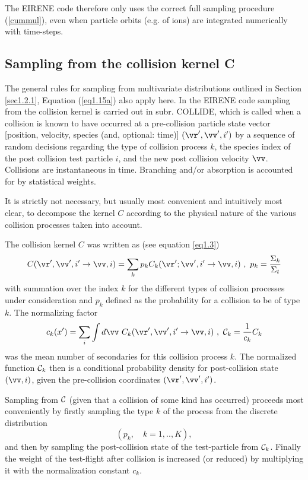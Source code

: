 The EIRENE code therefore only uses the correct full sampling procedure (\ref{cummul}), even when particle orbits (e.g. of ions) are
integrated numerically with time-steps.



\subsection{Sampling from the collision kernel C} \label{sec1.2.4}

The general rules for sampling from multivariate distributions
outlined in Section \ref{sec1.2.1}, Equation (\ref{eq1.15a}) also
apply here. In the EIRENE code sampling from the collision kernel is carried out in subr. COLLIDE, which is called when a collision is
known to have occurred at a pre-collision particle state vector [position, velocity, species (and, optional: time)] $( \vr ' , \vv ' , i ')$
by a sequence of random decisions regarding the type of collision process $k$, the species index of the post collision test particle $i$,
and the new post collision velocity $\vv$.  Collisions are instantaneous in time.
Branching and/or absorption is accounted for by statistical weights.

It is strictly not necessary, but usually most convenient and intuitively
most clear, to decompose the kernel $C$ according to the physical
nature of the various collision processes taken into account.

The collision kernel $C$ was written as (see equation \ref{eq1.3})
\begin{displaymath}
C( \vr ' , \vv ' , i '   \rightarrow
\vv , i) =   \sum_{k} {p_k  C_k ( \vr ' ;
              \vv ' , i '   \rightarrow \vv, i)} \
, \ p_k   =    \frac{\Sigma_k}{\Sigma_t}
\end{displaymath}
with summation over the index $k$ for the different types of
collision processes under consideration and $p_k$ defined as the
probability for a collision to be of type $k$. The normalizing
factor
\begin{displaymath}
c_k (x ')   =
  \sum_{i}   \int d \vv \ C_k (
\vr ' , \vv ' , i ' \rightarrow
\vv , i ) \   , \  {\cal{C}}_k   =    \frac{1}{c_k}
C_k
\end{displaymath}
was the mean number of secondaries for this collision process $k$. The normalized
function $ {\cal{C}}_k$ then is a conditional probability
density for post-collision state $(\vv,i)$, given the pre-collision
coordinates $(\vr',\vv',i')$.

Sampling from $\cal{C}$ (given that a collision of some kind has
occurred) proceeds most conveniently by firstly sampling the type
$k$ of the process from the discrete distribution
\begin{displaymath}
(p_k, \quad k=1,..,K),
\end{displaymath}
and then by sampling the post-collision state of the test-particle
from ${\cal{C}}_k$. Finally the weight of the test-flight after
collision is increased (or reduced) by multiplying it with the
normalization constant $c_k$.

